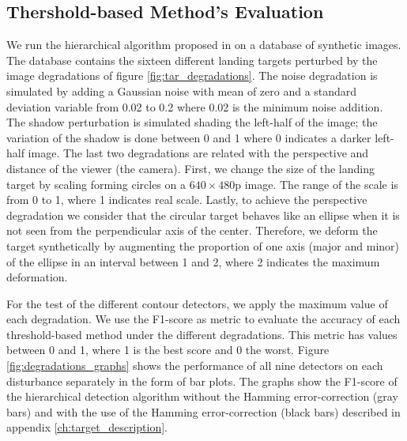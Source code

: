 \subsection{Thershold-based Method's Evaluation}
We run the hierarchical algorithm proposed in \citep{BaquedanoA.:ESIEE:2017} on a database of synthetic images. The database contains the sixteen different landing targets perturbed by the image degradations of figure \ref{fig:tar_degradations}. 
The noise degradation is simulated by adding a Gaussian noise with mean of zero and a standard deviation variable from 0.02 to 0.2 where 0.02 is the minimum noise addition. The shadow perturbation is simulated shading the left-half of the image; the variation of the shadow is done between 0 and 1 where 0 indicates a darker left-half image. The last two degradations are related with the perspective and distance of the viewer (the camera). First, we change the size of the landing target by scaling forming circles on a $640\times480$p image.  The range of the scale is from 0 to 1, where 1 indicates real scale. Lastly, to achieve the perspective degradation we consider that the circular target behaves like an ellipse when it is not seen from the perpendicular axis of the center. Therefore, we deform the target synthetically by augmenting the proportion of one axis (major and minor) of the ellipse in an interval between 1 and 2, where 2 indicates the maximum deformation. 

For the test of the different contour detectors, we apply the maximum value of each degradation. We use the F1-score as metric to evaluate the accuracy of each threshold-based method under the different degradations. This metric has values between 0 and 1, where 1 is the best score and 0 the worst. Figure \ref{fig:degradations_graphs} shows the performance of all nine detectors on each disturbance separately in the form of bar plots. The graphs show the F1-score of the hierarchical detection algorithm without the Hamming error-correction (gray bars) and with the use of the Hamming error-correction (black bars) described in appendix \ref{ch:target_description}.

